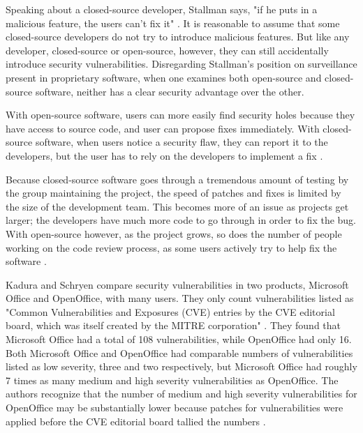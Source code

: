 Speaking about a closed-source developer, Stallman says, "if he puts in a
malicious feature, the users can't fix it" \citeyear[para. 36]{rms2011}.
It is reasonable to assume that some closed-source developers do not try
to introduce malicious features. But like any developer, closed-source or
open-source, however, they can still accidentally introduce security
vulnerabilities. Disregarding Stallman's position on surveillance present in
proprietary software, when one examines both open-source and closed-source
software, neither has a clear security advantage over the other.

With open-source software, users can more easily find security holes because
they have access to source code, and user can propose fixes immediately.
With closed-source software, when users notice a security flaw, they can report
it to the developers, but the user has to rely on the developers to implement a
fix \cite[para. 17]{kadura}.

Because closed-source software goes through a tremendous amount of testing
by the group maintaining the project, the speed of patches and fixes is limited
by the size of the development team. This becomes more of an issue as projects
get larger; the developers have much more code to go through in order to fix the
bug. With open-source however, as the project grows, so does the number of
people working on the code review process, as some users actively try to help
fix the software \cite[p. ~245]{boulanger}.

Kadura and Schryen compare security vulnerabilities in two products, Microsoft
Office and OpenOffice, with many users. They only count vulnerabilities listed
as "Common Vulnerabilities and Exposures (CVE) entries by the CVE editorial
board, which was itself created by the MITRE corporation"
\citeyear{kadura}. They found that Microsoft Office had a total of 108
vulnerabilities, while OpenOffice had only 16. Both Microsoft Office and
OpenOffice had comparable numbers of vulnerabilities listed as low severity,
three and two respectively, but Microsoft Office had roughly 7 times as many
medium and high severity vulnerabilities as OpenOffice. The authors recognize
that the number of medium and high severity vulnerabilities for OpenOffice may
be substantially lower because patches for vulnerabilities were applied before
the CVE editorial board tallied the numbers \cite{kadura}.


